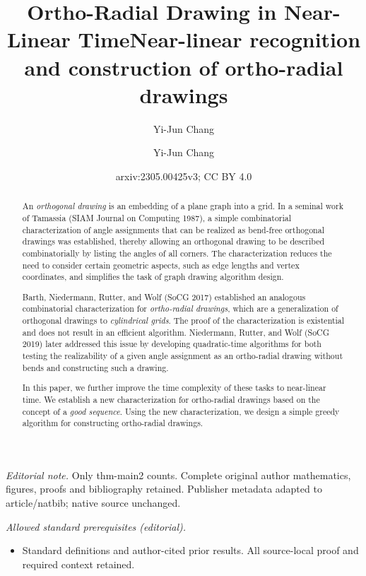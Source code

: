 \documentclass{article}\usepackage[a4paper,margin=20mm]{geometry}
\title{Ortho-Radial Drawing in Near-Linear Time}
\author{Yi-Jun Chang}\date{}
\title{Near-linear recognition and construction of ortho-radial drawings}
\author{Yi-Jun Chang}
\date{arxiv:2305.00425v3; CC BY 4.0}
\begin{document}
\maketitle
\noindent\textit{Editorial note.} Only thm-main2 counts. Complete original author mathematics, figures, proofs and bibliography retained. Publisher metadata adapted to article/natbib; native source unchanged.\par\medskip
\noindent\textit{Allowed standard prerequisites (editorial).}\begin{itemize}
\item Standard definitions and author-cited prior results. All source-local proof and required context retained.
\end{itemize}\medskip
\maketitle

\begin{abstract}
An \emph{orthogonal drawing} is an embedding of a plane graph into a grid. In a seminal work of Tamassia (SIAM Journal on Computing 1987), a simple combinatorial characterization of angle assignments that can be realized as bend-free orthogonal drawings was established, thereby allowing an orthogonal drawing to be described combinatorially by listing the angles of all corners. The characterization reduces the need to consider certain geometric aspects, such as edge lengths and vertex coordinates, and simplifies the task of graph drawing algorithm design.

Barth, Niedermann, Rutter, and Wolf (SoCG 2017) established an analogous combinatorial characterization for \emph{ortho-radial drawings}, which are a generalization of orthogonal drawings to \emph{cylindrical grids}. The proof of the characterization is existential and does not result in  an efficient algorithm. Niedermann, Rutter, and Wolf (SoCG 2019) later addressed this issue by developing quadratic-time algorithms for both testing the realizability of a given angle assignment as an ortho-radial drawing without bends and constructing such a drawing.

In this paper, we further improve the time complexity of these tasks to near-linear time. We establish a new characterization for ortho-radial drawings based on the concept of a \emph{good sequence}. Using the new characterization, we design a simple greedy algorithm for constructing ortho-radial drawings.
\end{abstract}
\end{document}
